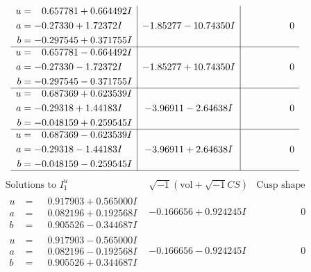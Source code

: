 \documentclass[1p]{elsarticle_modified}
\theoremstyle{definition}
\newcommand{\I}{\sqrt{-1}}
\begin{document}
$$\begin{array}{c|c|c}
\begin{aligned}
u &= \phantom{-}0.657781 + 0.664492 I \\
a &= -0.27330 + 1.72372 I \\
b &= -0.297545 + 0.371755 I\end{aligned}
 & -1.85277 - 10.74350 I & \phantom{-0.000000 } 0 \\ \hline\begin{aligned}
u &= \phantom{-}0.657781 - 0.664492 I \\
a &= -0.27330 - 1.72372 I \\
b &= -0.297545 - 0.371755 I\end{aligned}
 & -1.85277 + 10.74350 I & \phantom{-0.000000 } 0 \\ \hline\begin{aligned}
u &= \phantom{-}0.687369 + 0.623539 I \\
a &= -0.29318 + 1.44183 I \\
b &= -0.048159 + 0.259545 I\end{aligned}
 & -3.96911 - 2.64638 I & \phantom{-0.000000 } 0 \\ \hline\begin{aligned}
u &= \phantom{-}0.687369 - 0.623539 I \\
a &= -0.29318 - 1.44183 I \\
b &= -0.048159 - 0.259545 I\end{aligned}
 & -3.96911 + 2.64638 I & \phantom{-0.000000 } 0\\
 \hline 
 \end{array}$$\newpage$$\begin{array}{c|c|c}  
\text{Solutions to }I^u_{1}& \I (\text{vol} + \sqrt{-1}CS) & \text{Cusp shape}\\
 \hline 
\begin{aligned}
u &= \phantom{-}0.917903 + 0.565000 I \\
a &= \phantom{-}0.082196 + 0.192568 I \\
b &= \phantom{-}0.905526 - 0.344687 I\end{aligned}
 & -0.166656 + 0.924245 I & \phantom{-0.000000 } 0 \\ \hline\begin{aligned}
u &= \phantom{-}0.917903 - 0.565000 I \\
a &= \phantom{-}0.082196 - 0.192568 I \\
b &= \phantom{-}0.905526 + 0.344687 I\end{aligned}
 & -0.166656 - 0.924245 I & \phantom{-0.000000 } 0 \\ \hline\begin{aligned}

\end{aligned}
\end{array}$$
\end{document}
